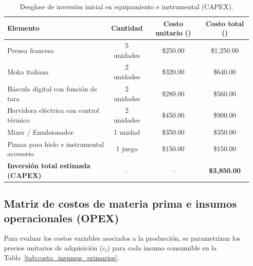 \documentclass{article}
\begin{document}
\begin{table}[H]
	\centering
	\caption{Desglose de inversión inicial en equipamiento e instrumental (CAPEX).}
	\label{tab:costos_hardware}
	\vspace{6pt}
	\begin{tabular}{lccc}
		\toprule
		\textbf{Elemento} & \textbf{Cantidad} & \textbf{Costo unitario (\text{\$ MXN})} & \textbf{Costo total (\text{\$ MXN})} \\
		\midrule
		Prensa francesa & 5 unidades & \$250.00 & \$1,250.00 \\
		Moka italiana & 2 unidades & \$320.00 & \$640.00 \\
		Báscula digital con función de tara & 2 unidades & \$280.00 & \$560.00 \\
		Hervidora eléctrica con control térmico & 2 unidades & \$450.00 & \$900.00 \\
		Mixer / Emulsionador & 1 unidad & \$350.00 & \$350.00 \\
		Pinzas para hielo e instrumental accesorio & 1 juego & \$150.00 & \$150.00 \\
		\midrule
		\textbf{Inversión total estimada (CAPEX)} & -- & -- & \textbf{\$3,850.00} \\
		\bottomrule
	\end{tabular}
\end{table}

\subsection{Matriz de costos de materia prima e insumos operacionales (OPEX)}

Para evaluar los costos variables asociados a la producción, se parametrizan los precios unitarios de adquisición ($c_i$) para cada insumo consumible en la Tabla~\ref{tab:costo_insumos_primarios}.
\end{document}
